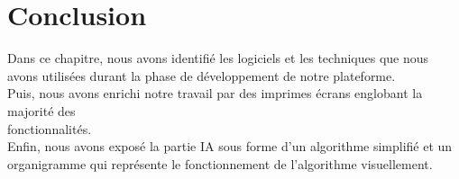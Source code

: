 \section{Conclusion}
Dans ce chapitre, nous avons identifié les logiciels et les techniques que nous avons utilisées
durant la phase de développement de notre plateforme.\\ Puis, nous avons enrichi notre travail
par des imprimes écrans englobant la majorité des\\ fonctionnalités. \\
Enfin, nous avons exposé la partie IA sous forme d'un algorithme simplifié et un organigramme qui représente le fonctionnement de l'algorithme visuellement.







